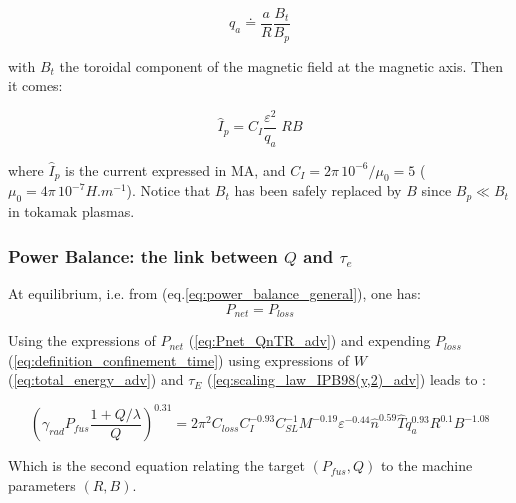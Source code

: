 \begin{equation*}
q_a \doteq \frac{a}{R} \frac{B_t}{B_p} 
\end{equation*}

\noindent
with $B_t$ the toroidal component of the magnetic field at the magnetic axis. Then it comes:

\begin{equation}
\hat I_p = C_I \frac{\varepsilon^2}{q_a} \; R B
\label{eq:plasma_current_adv}
\end{equation}

\noindent
where $\hat I_p$ is the current expressed in MA, and $C_I = 2\pi\, 10^{-6} /\mu_0 = 5$  ($\mu_0 = 4\pi\, 10^{-7} \si{H.m^{-1}}$).
Notice that $B_t$ has been safely replaced by $B$ since $B_p\ll B_t$ in tokamak plasmas. 

\subsubsection{Power Balance: the link between $Q$ and $\tau_e$}
At equilibrium, i.e. from (eq.\ref{eq:power_balance_general}), one has:
\begin{equation}
	P_{net} = P_{loss}
\end{equation}

Using the expressions of $P_{net}$ (\ref{eq:Pnet_QnTR_adv}) and expending $P_{loss}$ (\ref{eq:definition_confinement_time}) using expressions of $W$ (\ref{eq:total_energy_adv}) and $\tau_E$ (\ref{eq:scaling_law_IPB98(y,2)_adv}) leads to
:

\begin{equation}
	\left(
		\gamma_{rad} P_{fus} \frac{1 + Q/\lambda}{Q}
	\right)^{0.31}
	=
	2\pi^2 C_{loss}  C_I^{-0.93} C_{SL}^{-1}
	M^{-0.19} \varepsilon^{-0.44}
  \hat n^{0.59} \hat T  q_a^{0.93} R^{0.1} B^{-1.08} 
\end{equation}

Which is the second equation relating the target $(P_{fus}, Q)$ to the machine parameters $(R,B)$. 

